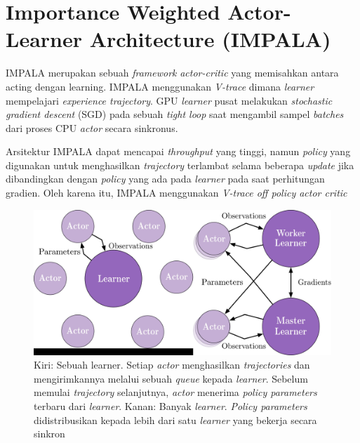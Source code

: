 \section{Importance Weighted Actor-Learner Architecture (IMPALA)}

IMPALA merupakan sebuah \emph{framework} \emph{actor-critic} yang memisahkan antara acting dengan learning.
IMPALA menggunakan \emph{V-trace} dimana \emph{learner} mempelajari \emph{experience trajectory}.
GPU \emph{learner} pusat melakukan \emph{stochastic gradient descent} (SGD) pada sebuah \emph{tight loop} saat mengambil sampel \emph{batches} dari proses CPU \emph{actor} secara sinkronus.

Arsitektur IMPALA dapat mencapai \emph{throughput} yang tinggi, namun \emph{policy} yang digunakan untuk menghasilkan \emph{trajectory} terlambat selama beberapa \emph{update} jika dibandingkan dengan \emph{policy} yang ada pada \emph{learner} pada saat perhitungan gradien.
Oleh karena itu, IMPALA menggunakan \emph{V-trace off policy actor critic}

\begin{figure}[H]
  \centering
    \includegraphics[scale=0.05]{gambar/impala_worker.jpg}
    \caption{Kiri: Sebuah learner. Setiap \emph{actor} menghasilkan \emph{trajectories} dan mengirimkannya melalui sebuah \emph{queue} kepada \emph{learner}.
    Sebelum memulai \emph{trajectory} selanjutnya, \emph{actor} menerima \emph{policy parameters} terbaru dari \emph{learner}.
    Kanan: Banyak \emph{learner}. \emph{Policy parameters} didistribusikan kepada lebih dari satu \emph{learner} yang bekerja secara sinkron}
    \label{fig:impalaSingleVsMultipleLearner}
\end{figure}


